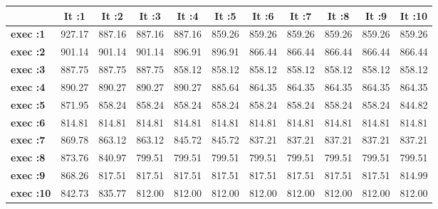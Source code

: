 \begin{tiny}\begin{tabular}{|l|c|c|c|c|c|c|c|c|c|c|}
\hline
&\textbf{It :1}&\textbf{It :2}&\textbf{It :3}&\textbf{It :4}&\textbf{It :5}&\textbf{It :6}&\textbf{It :7}&\textbf{It :8}&\textbf{It :9}&\textbf{It :10}\\\hline
\textbf{exec :1}&927.17&887.16&887.16&887.16&859.26&859.26&859.26&859.26&859.26&859.26\\\hline
\textbf{exec :2}&901.14&901.14&901.14&896.91&896.91&866.44&866.44&866.44&866.44&866.44\\\hline
\textbf{exec :3}&887.75&887.75&887.75&858.12&858.12&858.12&858.12&858.12&858.12&858.12\\\hline
\textbf{exec :4}&890.27&890.27&890.27&890.27&885.64&864.35&864.35&864.35&864.35&864.35\\\hline
\textbf{exec :5}&871.95&858.24&858.24&858.24&858.24&858.24&858.24&858.24&858.24&844.82\\\hline
\textbf{exec :6}&814.81&814.81&814.81&814.81&814.81&814.81&814.81&814.81&814.81&814.81\\\hline
\textbf{exec :7}&869.78&863.12&863.12&845.72&845.72&837.21&837.21&837.21&837.21&837.21\\\hline
\textbf{exec :8}&873.76&840.97&799.51&799.51&799.51&799.51&799.51&799.51&799.51&799.51\\\hline
\textbf{exec :9}&868.26&817.51&817.51&817.51&817.51&817.51&817.51&817.51&817.51&814.99\\\hline
\textbf{exec :10}&842.73&835.77&812.00&812.00&812.00&812.00&812.00&812.00&812.00&812.00\\\hline
\end{tabular}
\end{tiny}